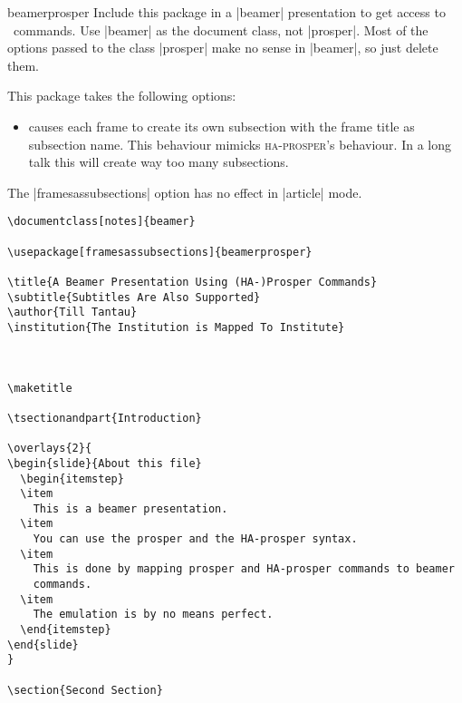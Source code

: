 \begin{package}{{beamerprosper}}
  Include this package in a |beamer| presentation to get access to \prosper\ commands. Use |beamer| as the document class, not |prosper|. Most of the options passed to the class |prosper| make no sense in |beamer|, so just delete them.

  This package takes the following options:
  \begin{itemize}
    \item
     causes each frame to create its own subsection with the frame title as subsection name. This behaviour mimicks \textsc{ha}-\textsc{prosper}'s behaviour. In a long talk this will create way too many subsections.
  \end{itemize}

  \articlenote
  The |framesassubsections| option has no effect in |article| mode.

  \example
\begin{verbatim}
\documentclass[notes]{beamer}

\usepackage[framesassubsections]{beamerprosper}

\title{A Beamer Presentation Using (HA-)Prosper Commands}
\subtitle{Subtitles Are Also Supported}
\author{Till Tantau}
\institution{The Institution is Mapped To Institute}



\maketitle

\tsectionandpart{Introduction}

\overlays{2}{
\begin{slide}{About this file}
  \begin{itemstep}
  \item
    This is a beamer presentation.
  \item
    You can use the prosper and the HA-prosper syntax.
  \item
    This is done by mapping prosper and HA-prosper commands to beamer
    commands.
  \item
    The emulation is by no means perfect.
  \end{itemstep}
\end{slide}
}

\section{Second Section}

\end{verbatim}
\end{package}

